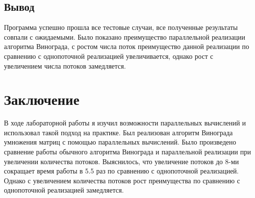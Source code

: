 \documentclass[a4paper,12pt]{report}
\begin{document}
\section{Вывод}
Программа успешно прошла все тестовые случаи, все полученные результаты совпали с ожидаемыми.
Было показано преимущество параллельной реализации алгоритма Винограда, с ростом числа поток преимущество данной реализации по сравнению с однопоточной реализацией увеличивается, однако рост с увеличением числа потоков замедляется.

\newpage
\chapter*{Заключение}
\hspace{0.6cm}В ходе лабораторной работы я изучил возможности параллельных вычислений и использовал такой подход на практике. Был реализован алгоритм Винограда умножения матриц
с помощью параллельных вычислений.
Было произведено сравнение работы обычного алгоритма Винограда и параллельной реализации при увеличении количества потоков. Выяснилось, что увеличение потоков до 8-ми сокращает время работы в 5.5 раз по сравнению с
однопоточной реализацией. Однако с увеличением количества потоков рост преимущества по сравнению с однопоточной реализацией замедляется.       
\end{document}
